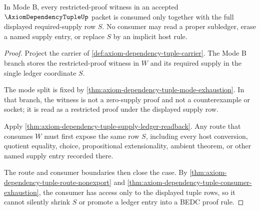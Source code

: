 \begin{theorem}
\label{thm:axiom-dependency-tuple-restricted-supply-ledger-totality}
In Mode B, every restricted-proof witness in an accepted
$\AxiomDependencyTupleUp$ packet is consumed only together with the full
displayed required-supply row $S$. No consumer may read a proper subledger,
erase a named supply entry, or replace $S$ by an implicit host rule.
\end{theorem}
\begin{proof}
Project the carrier of \autoref{def:axiom-dependency-tuple-carrier}. The Mode B
branch stores the restricted-proof witness in $W$ and its required supply in the
single ledger coordinate $S$.

The mode split is fixed by
\autoref{thm:axiom-dependency-tuple-mode-exhaustion}. In that branch, the witness
is not a zero-supply proof and not a counterexample or socket; it is read as a
restricted proof under the displayed supply row.

Apply \autoref{thm:axiom-dependency-tuple-supply-ledger-readback}. Any route that
consumes $W$ must first expose the same row $S$, including every host conversion,
quotient equality, choice, propositional extensionality, ambient theorem, or
other named supply entry recorded there.

The route and consumer boundaries then close the case. By
\autoref{thm:axiom-dependency-tuple-route-nonexport} and
\autoref{thm:axiom-dependency-tuple-consumer-exhaustion}, the consumer has access
only to the displayed tuple rows, so it cannot silently shrink $S$ or promote a
ledger entry into a BEDC proof rule.
\end{proof}

